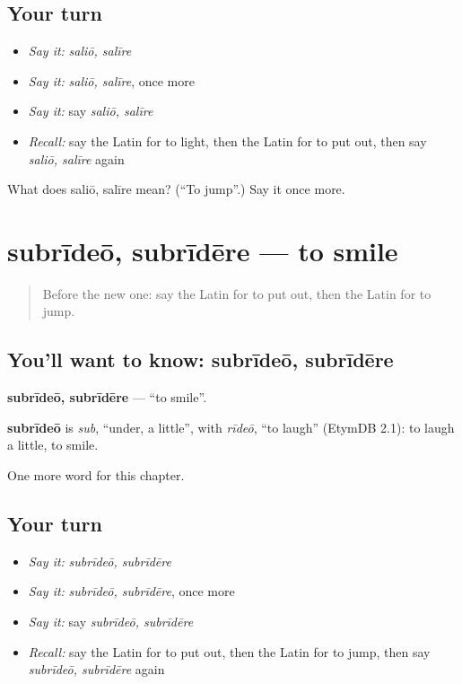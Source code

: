 \subsection*{Your turn}
\begin{itemize}
\raggedright
  \item \emph{Say it:} \emph{saliō, salīre}
  \item \emph{Say it:} \emph{saliō, salīre}, once more
  \item \emph{Say it:} say \emph{saliō, salīre}
  \item \emph{Recall:} say the Latin for to light, then the Latin for to put out, then say \emph{saliō, salīre} again
\end{itemize}

\begin{tcolorbox}[breakable,colback=teal!4,colframe=teal!35!black,title={Before you move on}]
What does saliō, salīre mean? (\textquotedblleft{}To jump\textquotedblright{}.) Say it once more.
\end{tcolorbox}
\section[subrīdeō, subrīdēre]{subrīdeō, subrīdēre — to smile}

\label{lesson:LA-C165-subrideo}



\begin{quote}
Before the new one: say the Latin for to put out, then the Latin for to jump.
\end{quote}

\subsection*{You'll want to know: subrīdeō, subrīdēre}
\textbf{subrīdeō, subrīdēre} — \textquotedblleft{}to smile\textquotedblright{}.

\begin{cousinweb}
\textbf{subrīdeō} is \emph{sub}, \textquotedblleft{}under, a little\textquotedblright{}, with \emph{rīdeō}, \textquotedblleft{}to laugh\textquotedblright{} (EtymDB 2.1): to laugh a little, to smile.
\end{cousinweb}

\begin{grammarlens}[title={What you've built}]
One more word for this chapter.
\end{grammarlens}

\subsection*{Your turn}
\begin{itemize}
\raggedright
  \item \emph{Say it:} \emph{subrīdeō, subrīdēre}
  \item \emph{Say it:} \emph{subrīdeō, subrīdēre}, once more
  \item \emph{Say it:} say \emph{subrīdeō, subrīdēre}
  \item \emph{Recall:} say the Latin for to put out, then the Latin for to jump, then say \emph{subrīdeō, subrīdēre} again
\end{itemize}

